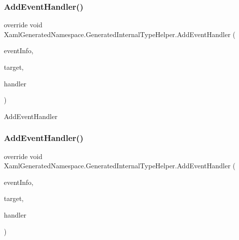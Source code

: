 \subsubsection{\texorpdfstring{Add\+Event\+Handler()}{AddEventHandler()}\hspace{0.1cm}{\footnotesize\ttfamily [2/3]}}
{\footnotesize\ttfamily override void Xaml\+Generated\+Namespace.\+Generated\+Internal\+Type\+Helper.\+Add\+Event\+Handler (\begin{DoxyParamCaption}\item[{System.\+Reflection.\+Event\+Info}]{event\+Info,  }\item[{object}]{target,  }\item[{System.\+Delegate}]{handler }\end{DoxyParamCaption})\hspace{0.3cm}{\ttfamily [protected]}}



Add\+Event\+Handler 

\mbox{\label{class_xaml_generated_namespace_1_1_generated_internal_type_helper_a73471f4a6d1ca4c4fceec9ad8610f0c8}} 
\subsubsection{\texorpdfstring{Add\+Event\+Handler()}{AddEventHandler()}\hspace{0.1cm}{\footnotesize\ttfamily [3/3]}}
{\footnotesize\ttfamily override void Xaml\+Generated\+Namespace.\+Generated\+Internal\+Type\+Helper.\+Add\+Event\+Handler (\begin{DoxyParamCaption}\item[{System.\+Reflection.\+Event\+Info}]{event\+Info,  }\item[{object}]{target,  }\item[{System.\+Delegate}]{handler }\end{DoxyParamCaption})\hspace{0.3cm}{\ttfamily [protected]}}



